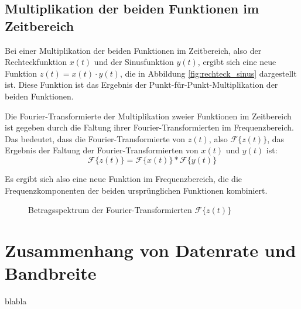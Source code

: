 \subsection{Multiplikation der beiden Funktionen im Zeitbereich}
Bei einer Multiplikation der beiden Funktionen im Zeitbereich, also der Rechteckfunktion $x(t)$ und der Sinusfunktion $y(t)$, ergibt sich eine neue Funktion $z(t) =  x(t) \cdot y(t)$, die in Abbildung \ref{fig:rechteck_sinus} dargestellt ist. Diese Funktion ist das Ergebnis der Punkt-für-Punkt-Multiplikation der beiden Funktionen.


Die Fourier-Transformierte der Multiplikation zweier Funktionen im Zeitbereich ist gegeben durch die Faltung ihrer Fourier-Transformierten im Frequenzbereich. Das bedeutet, dass die Fourier-Transformierte von $z(t)$, also $\mathcal{F}\{z(t)\}$, das Ergebnis der Faltung der Fourier-Transformierten von $x(t)$ und $y(t)$ ist:
\[
\mathcal{F}\{z(t)\} = \mathcal{F}\{x(t)\} * \mathcal{F}\{y(t)\}
\]

Es ergibt sich also eine neue Funktion im Frequenzbereich, die die Frequenzkomponenten der beiden ursprünglichen Funktionen kombiniert.
\begin{figure}[H]
\centering
{}
\caption{Betragsspektrum der Fourier-Transformierten $\mathcal{F}\{z(t)\}$}
\label{fig:fourier_rechteck_sinus}
\end{figure}

\section{Zusammenhang von Datenrate und Bandbreite}
blabla
\clearpage